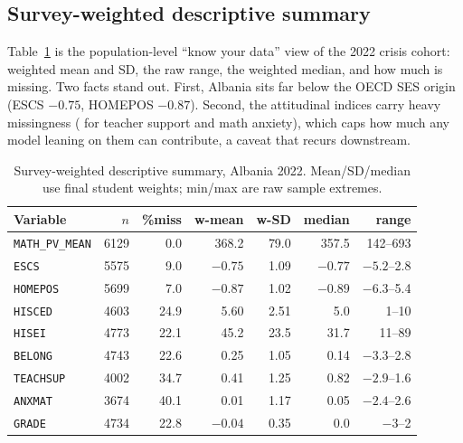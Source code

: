 \subsection{Survey-weighted descriptive summary}
Table~\ref{tab:describe} is the population-level ``know your data'' view of the 2022
crisis cohort: weighted mean and SD, the raw range, the weighted median, and how much
is missing. Two facts stand out. First, Albania sits far below the OECD SES origin
(ESCS $-0.75$, HOMEPOS $-0.87$). Second, the attitudinal indices carry heavy
missingness ( for teacher support and math anxiety), which caps how
much any model leaning on them can contribute, a caveat that recurs downstream.

\begin{table}[t]
\centering
\caption[Survey-weighted descriptive summary, Albania 2022]{Survey-weighted descriptive summary, Albania 2022. Mean/SD/median use final
student weights; min/max are raw sample extremes.}
\label{tab:describe}
\small
\begin{tabular}{@{}l r r r r r r@{}}
\toprule
Variable & $n$ & \%miss & w-mean & w-SD & median & range \\
\midrule
\texttt{MATH\_PV\_MEAN} & 6129 & 0.0  & 368.2 & 79.0 & 357.5 & 142--693 \\
\texttt{ESCS}           & 5575 & 9.0  & $-0.75$ & 1.09 & $-0.77$ & $-5.2$--2.8 \\
\texttt{HOMEPOS}        & 5699 & 7.0  & $-0.87$ & 1.02 & $-0.89$ & $-6.3$--5.4 \\
\texttt{HISCED}         & 4603 & 24.9 & 5.60 & 2.51 & 5.0 & 1--10 \\
\texttt{HISEI}          & 4773 & 22.1 & 45.2 & 23.5 & 31.7 & 11--89 \\
\texttt{BELONG}         & 4743 & 22.6 & 0.25 & 1.05 & 0.14 & $-3.3$--2.8 \\
\texttt{TEACHSUP}       & 4002 & 34.7 & 0.41 & 1.25 & 0.82 & $-2.9$--1.6 \\
\texttt{ANXMAT}         & 3674 & 40.1 & 0.01 & 1.17 & 0.05 & $-2.4$--2.6 \\
\texttt{GRADE}          & 4734 & 22.8 & $-0.04$ & 0.35 & 0.0 & $-3$--2 \\
\bottomrule
\end{tabular}
\end{table}

